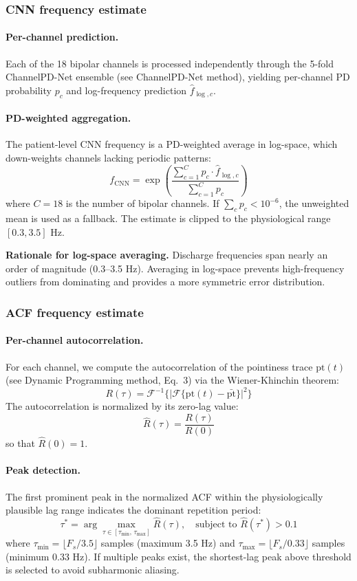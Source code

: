 \subsubsection{CNN frequency estimate}

\paragraph{Per-channel prediction.}
Each of the 18 bipolar channels is processed independently through the 5-fold ChannelPD-Net ensemble (see ChannelPD-Net method), yielding per-channel PD probability $p_c$ and log-frequency prediction $\hat{f}_{\log,c}$.

\paragraph{PD-weighted aggregation.}
The patient-level CNN frequency is a PD-weighted average in log-space, which down-weights channels lacking periodic patterns:
\[ f_{\mathrm{CNN}} = \exp\!\left(\frac{\sum_{c=1}^{C} p_c \cdot \hat{f}_{\log,c}}{\sum_{c=1}^{C} p_c}\right) \tag{1} \]
where $C = 18$ is the number of bipolar channels. If $\sum_c p_c < 10^{-6}$, the unweighted mean is used as a fallback. The estimate is clipped to the physiological range $[0.3, 3.5]$ Hz.

\textbf{Rationale for log-space averaging.} Discharge frequencies span nearly an order of magnitude (0.3--3.5 Hz). Averaging in log-space prevents high-frequency outliers from dominating and provides a more symmetric error distribution.

\subsubsection{ACF frequency estimate}

\paragraph{Per-channel autocorrelation.}
For each channel, we compute the autocorrelation of the pointiness trace $\mathrm{pt}(t)$ (see Dynamic Programming method, Eq.~3) via the Wiener-Khinchin theorem:
\[ R(\tau) = \mathcal{F}^{-1}\!\Big\{\big|\mathcal{F}\{\mathrm{pt}(t) - \bar{\mathrm{pt}}\}\big|^2\Big\} \tag{2} \]
The autocorrelation is normalized by its zero-lag value:
\[ \hat{R}(\tau) = \frac{R(\tau)}{R(0)} \tag{3} \]
so that $\hat{R}(0) = 1$.

\paragraph{Peak detection.}
The first prominent peak in the normalized ACF within the physiologically plausible lag range indicates the dominant repetition period:
\[ \tau^* = \arg\max_{\tau \in [\tau_{\min},\, \tau_{\max}]} \hat{R}(\tau), \quad \text{subject to } \hat{R}(\tau^*) > 0.1 \tag{4} \]
where $\tau_{\min} = \lfloor F_s / 3.5 \rfloor$ samples (maximum 3.5 Hz) and $\tau_{\max} = \lfloor F_s / 0.33 \rfloor$ samples (minimum 0.33 Hz). If multiple peaks exist, the shortest-lag peak above threshold is selected to avoid subharmonic aliasing.

